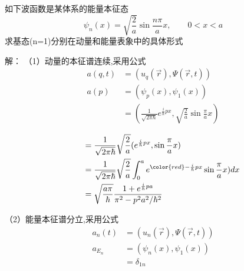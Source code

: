 \begin{frame} [allowframebreaks=]
    \begin{tcolorbox}[colback=yellow!5,colframe=yellow!75!black,title=例2：]
        如下波函数是某体系的能量本征态\\
        $$ \psi_n(x)=\sqrt{\frac{2}{a}} \sin \frac{n\pi}{a}x, \qquad 0<x<a $$
        求基态(n=1)分别在动量和能量表象中的具体形式
    \end{tcolorbox}
    \alert{解：} （1）动量的本征谱连续,采用公式\\
    \begin{equation*}
        \begin{split}
            a(q,t)&=(u_q(\vec{r}), \Psi(\vec{r},t)) \\
            a(p)&= (\psi_{p}(x), \psi_1(x))\\
            &= (\frac{1}{\sqrt{2\pi\hbar}}e^{\frac{i}{\hbar}px}, \sqrt{\frac{2}{a}} \sin \frac{\pi}{a}x)
        \end{split} 
    \end{equation*}

    \begin{equation*}
        \begin{split}
          ~~~~~~&= \frac{1}{\sqrt{2\pi\hbar}}\sqrt{\frac{2}{a}} (e^{\frac{i}{\hbar}px},  \sin \frac{\pi}{a}x)\\
            &= \frac{1}{\sqrt{2\pi\hbar}}\sqrt{\frac{2}{a}} \int_0 ^a e^{{\color{red}-}\frac{i}{\hbar}px}\sin \frac{\pi}{a}x) dx\\
            &=\sqrt{\frac{a\pi}{\hbar}} \frac{1+e^{\frac{i}{\hbar}pa}}{\pi^2-p^2a^2/\hbar^2}
        \end{split} 
    \end{equation*}

    （2）能量本征谱分立,采用公式\\
    \begin{equation*}
        \begin{split}
            a_n(t)&=(u_n(\vec{r}), \Psi(\vec{r},t)) \\
            a_{E_n}&=(\psi_n(x), \psi_1(x)) \\
            &=\delta_{1n} \\
        \end{split} 
    \end{equation*}  
\end{frame} 


